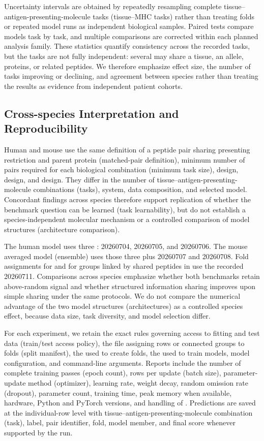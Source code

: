 Uncertainty intervals are obtained by repeatedly resampling complete tissue--antigen-presenting-molecule tasks (tissue--MHC tasks) rather than treating folds or repeated model runs as independent biological samples. Paired tests compare models task by task, and multiple comparisons are corrected within each planned analysis family. These statistics quantify consistency across the recorded tasks, but the tasks are not fully independent: several may share a tissue, an allele, proteins, or related peptides. We therefore emphasize effect size, the number of tasks improving or declining, and agreement between species rather than treating the results as evidence from independent patient cohorts.

\subsection{Cross-species Interpretation and Reproducibility}

Human and mouse use the same definition of a peptide pair sharing presenting restriction and parent protein (matched-pair definition), minimum number of pairs required for each biological combination (minimum task size), \plainFixedTest{} design, \plainPairOOF{} design, and \plainPeptideOOF{} design. They differ in the number of tissue--antigen-presenting-molecule combinations (tasks), \plainMHC{} system, data composition, and selected model. Concordant findings across species therefore support replication of whether the benchmark question can be learned (task learnability), but do not establish a species-independent molecular mechanism or a controlled comparison of model structures (architecture comparison).

The human model uses three \plainSeeds{}: 20260704, 20260705, and 20260706. The mouse averaged model (ensemble) uses those three \plainSeeds{} plus 20260707 and 20260708. Fold assignments for \plainPairOOF{} and for groups linked by shared peptides in \plainPeptideOOF{} use the recorded \plainSplitSeed{} 20260711. Comparisons across species emphasize whether both benchmarks retain above-random signal and whether structured information sharing improves upon simple sharing under the same protocols. We do not compare the numerical advantage of the two model structures (architectures) as a controlled species effect, because data size, task diversity, and model selection differ.

For each experiment, we retain the exact rules governing access to fitting and test data (train/test access policy), the file assigning rows or connected groups to folds (split manifest), the \plainSplitSeed{} used to create folds, the \plainSeeds{} used to train models, model configuration, and command-line arguments. Reports include the number of complete training passes (epoch count), rows per update (batch size), parameter-update method (optimizer), learning rate, weight decay, random omission rate (dropout), parameter count, training time, peak memory when available, hardware, Python and PyTorch versions, and handling of \plainSeeds{}. Predictions are saved at the individual-row level with tissue--antigen-presenting-molecule combination (task), label, pair identifier, fold, model member, and final score whenever supported by the run.

